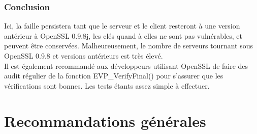 		\subsubsection{Conclusion}

			Ici, la faille persistera tant que le serveur et le client resteront à une version antérieur à OpenSSL 0.9.8j, les clés quand à elles ne sont pas vulnérables, et peuvent être conservées. Malheureusement, le nombre de serveurs tournant sous OpenSSL 0.9.8 et versions antérieurs est très élevé.\\

			Il est également recommandé aux développeurs utilisant OpenSSL de faire des audit régulier de la fonction EVP\_VerifyFinal() pour s'assurer que les vérifications sont bonnes. Les tests étants assez simple à effectuer.

\section{Recommandations générales}
